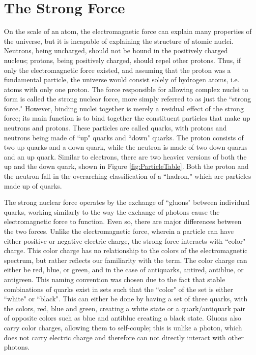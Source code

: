 \section{The Strong Force} \label{sec:StrongForce}
On the scale of an atom, the electromagnetic force can explain many properties of the universe, but it is incapable of explaining the structure of atomic nuclei. Neutrons, being uncharged, should not be bound in the positively charged nucleus; protons, being positively charged, should repel other protons. Thus, if only the electromagnetic force existed, and assuming that the proton was a fundamental particle, the universe would consist solely of hydrogen atoms, i.e. atoms with only one proton. The force responsible for allowing complex nuclei to form is called the strong nuclear force, more simply referred to as just the ``strong force." However, binding nuclei together is merely a residual effect of the strong force; its main function is to bind together the constituent particles that make up neutrons and protons. These particles are called quarks, with protons and neutrons being made of ``up" quarks and ``down" quarks. The proton consists of two up quarks and a down quark, while the neutron is made of two down quarks and an up quark. Similar to electrons, there are two heavier versions of both the up and the down quark, shown in Figure \ref{fig:ParticleTable}. Both the proton and the neutron fall in the overarching classification of a ``hadron," which are particles made up of quarks.\par 

	The strong nuclear force operates by the exchange of ``gluons" between individual quarks, working similarly to the way the exchange of photons cause the electromagnetic force to function. Even so, there are major differences between the two forces. Unlike the electromagnetic force, wherein a particle can have either positive or negative electric charge, the strong force interacts with ``color" charge. This color charge has no relationship to the colors of the electromagnetic spectrum, but rather reflects our familiarity with the term.  The color charge can either be red, blue, or green, and in the case of antiquarks, antired, antiblue, or antigreen. This naming convention was chosen due to the fact that stable combinations of quarks exist in sets such that the ``color" of the set is either ``white" or ``black". This can either be done by having a set of three quarks, with the colors, red, blue and green, creating a white state or a quark/antiquark pair of opposite colors such as blue and antiblue creating a black state. Gluons also carry color charges, allowing them to self-couple; this is unlike a photon, which does not carry electric charge and therefore can not directly interact with other photons.
	
